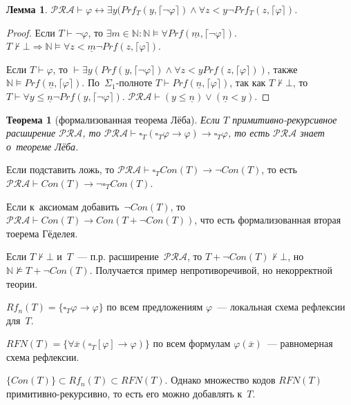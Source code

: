 \documentclass{article}
\newtheorem{theorem}{Теорема}
\newtheorem{lemma}{Лемма}
\theoremstyle{remark}
\renewcommand{\le}{\leqslant}
\renewcommand{\phi}{\varphi}
\begin{document}
\begin{lemma}
  $\mathcal{PRA} \vdash \phi \leftrightarrow \exists y(Prf_T(y,\lceil \neg \phi
  \rceil) \land \forall z < y \neg Prf_T(z, \lceil \phi \rceil)$.
\end{lemma}
\begin{proof}
  Если $T \vdash \neg \phi$, то $\exists m \in \mathbb{N}: \mathbb{N} \vDash
  \forall Prf(\underline{m}, \lceil \neg \phi \rceil)$.
  $T \not\vdash \bot \Rightarrow \mathbb{N} \vDash \forall z < \underline{m}
  \neg Prf(z, \lceil \phi \rceil)$.

  Если $T \vdash \phi$, то $\vdash \exists y(Prf(y, \lceil \neg \phi \rceil)
  \land \forall z < y Prf(z, \lceil \phi \rceil))$, также $\mathbb{N} \vDash
  Prf(\underline{n}, \lceil \phi \rceil)$. По~$\Sigma_1$-полноте $T \vdash
  Prf(\underline{n}, \lceil \phi \rceil)$, так как $T \not\vdash \bot$, то $T
  \vdash \forall y \le \underline{n} \neg Prf(y, \lceil \neg \phi \rceil)$.
  $\mathcal{PRA} \vdash (y \le \underline{n}) \lor (\underline{n} < y)$.
\end{proof}

\begin{theorem}[формализованная теорема Лёба]
  Если $T$ примитивно-рекурсивное расширение $\mathcal{PRA}$, то $\mathcal{PRA}
  \vdash \square_T(\square_T \phi \rightarrow \phi) \rightarrow \square_T \phi$,
  то есть $\mathcal{PRA}$ знает о~теореме Лёба.
\end{theorem}

Если подставить ложь, то $\mathcal{PRA} \vdash \square_T Con(T) \rightarrow \neg
Con(T)$, то есть $\mathcal{PRA} \vdash Con(T) \rightarrow \neg \square_T
Con(T)$.

Если к~аксиомам добавить~$\neg Con(T)$, то $\mathcal{PRA} \vdash Con(T)
\rightarrow Con(T + \neg Con(T))$, что есть формализованная вторая тоерема
Гёделея.

Если $T \not \vdash \bot$ и~$T$~--- п.р. расширение~$\mathcal{PRA}$, то $T +
\neg Con(T) \not \vdash \bot$, но $\mathbb{N} \not \vDash T + \neg Con(T)$.
Получается пример непротиворечивой, но некорректной теории.

$Rf_n(T) = \{ \square_T \phi \rightarrow \phi \}$ по всем предложениям
$\phi$~--- локальная схема рефлексии для~$T$.

$RFN(T) = \{ \forall \overline{x} (\square_T [\phi] \rightarrow \phi) \}$ по
всем формулам $\phi(\overline{x})$~--- равномерная схема рефлексии.

$\{Con(T)\} \subset Rf_n(T) \subset RFN(T)$. Однако множество кодов $RFN(T)$
примитивно-рекурсивно, то есть его можно добавлять к~$T$.
\end{document}
